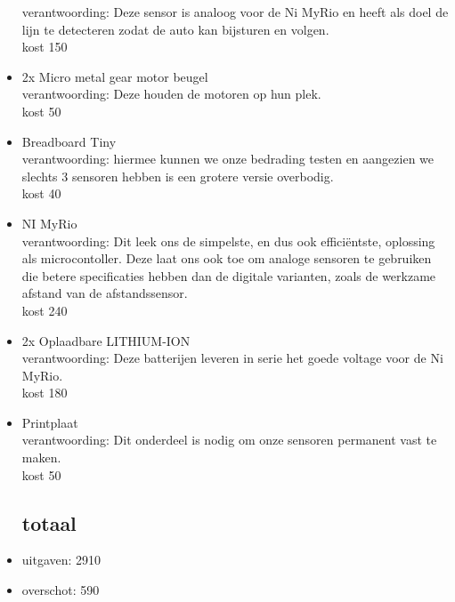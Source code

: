 \documentclass[12pt]{article}
\begin{document}
\begin{itemize}
	verantwoording: Deze sensor is analoog voor de Ni MyRio en heeft als doel de lijn te detecteren zodat de auto kan bijsturen en volgen.\\
	kost 150
	\item 2x Micro metal gear motor beugel\\
	verantwoording: Deze houden de motoren op hun plek.\\
	kost 50
	\item Breadboard Tiny\\
	verantwoording: hiermee kunnen we onze bedrading testen en aangezien we slechts 3 sensoren hebben is een grotere versie overbodig.\\
	kost 40
	\item NI MyRio\\
	verantwoording: Dit leek ons de simpelste, en dus ook efficiëntste, oplossing als microcontoller. Deze laat ons ook toe om analoge sensoren te gebruiken die betere specificaties hebben dan de digitale varianten, zoals de werkzame afstand van de afstandssensor.\\
	kost 240
	\item 2x Oplaadbare LITHIUM-ION\\
	verantwoording: Deze batterijen leveren in serie het goede voltage voor de Ni MyRio.\\
	kost 180
	\item Printplaat\\
	verantwoording: Dit onderdeel is nodig om onze sensoren permanent vast te maken.\\
	kost 50
\subsection*{totaal}
 \item uitgaven: 2910
 \item overschot: 590


\end{itemize}
\end{document}
